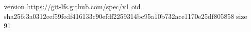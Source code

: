 version https://git-lfs.github.com/spec/v1
oid sha256:3a0312eef59fedf416133c90efdf2259314bc95a10b732ace1170e25df805858
size 91
